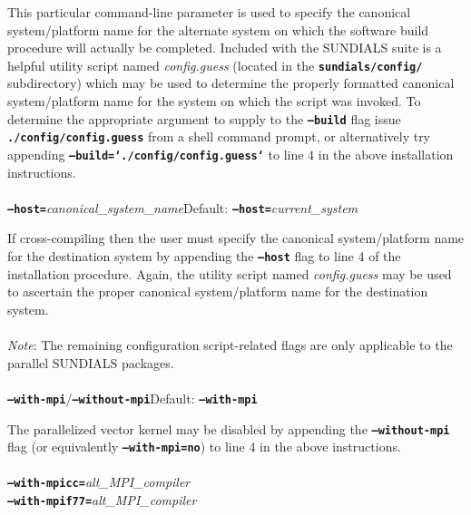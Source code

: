 \documentclass[10pt]{report}
\begin{document}
This particular command-line parameter is used to specify the canonical system/platform name for the alternate system on which the software build procedure will actually be completed.  Included with the \small SUNDIALS \normalsize suite is a helpful utility script named \textit{config.guess} (located in the \texttt{\textbf{sundials/config/}} subdirectory) which may be used to determine the properly formatted canonical system/platform name for the system on which the script was invoked.  To determine the appropriate argument to supply to the \texttt{\textbf{--build}} flag issue \texttt{\textbf{./config/config.guess}} from a shell command prompt, or alternatively try appending \texttt{\textbf{--build=`./config/config.guess`}} to line \small 4 \normalsize in the above installation instructions.
\\
\\
\texttt{\textbf{--host=}}\textit{canonical\_system\_name}\hspace{0.5in}Default: \texttt{\textbf{--host=}}\textit{current\_system}\vspace{0.05in}

If cross-compiling then the user must specify the canonical system/platform name for the destination system by appending the \texttt{\textbf{--host}} flag to line \small 4 \normalsize of the installation procedure.  Again, the utility script named \textit{config.guess} may be used to ascertain the proper canonical system/platform name for the destination system.
\\
\\
\textit{Note}: The remaining configuration script-related flags are only applicable to the parallel \small SUNDIALS \normalsize packages.
\\
\\
\texttt{\textbf{--with-mpi}}/\texttt{\textbf{--without-mpi}}\hspace{0.5in}Default: \texttt{\textbf{--with-mpi}}\vspace{0.05in}

The parallelized vector kernel may be disabled by appending the \texttt{\textbf{--without-mpi}} flag (or equivalently \texttt{\textbf{--with-mpi=no}}) to line \small 4 \normalsize in the above instructions.
\\
\\
\texttt{\textbf{--with-mpicc=}}\textit{alt\_\small MPI\normalsize \_compiler}\\
\texttt{\textbf{--with-mpif77=}}\textit{alt\_\small MPI\normalsize \_compiler}\vspace{0.05in}
\end{document}
